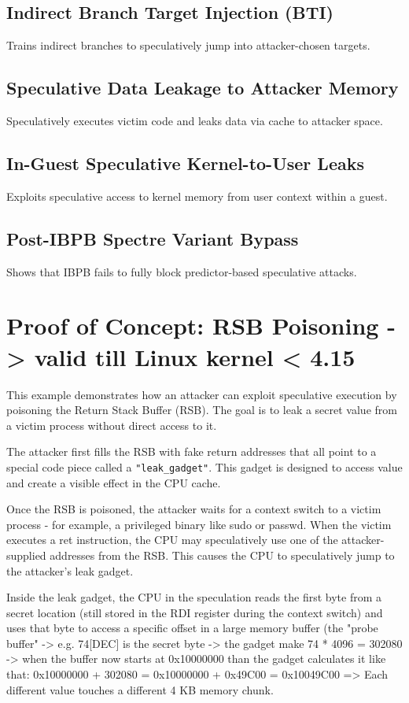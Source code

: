\documentclass[11pt,a4paper]{article}
\begin{document}
\subsection*{Indirect Branch Target Injection (BTI)}
Trains indirect branches to speculatively jump into attacker-chosen targets.

\subsection*{Speculative Data Leakage to Attacker Memory}
Speculatively executes victim code and leaks data via cache to attacker space.

\subsection*{In-Guest Speculative Kernel-to-User Leaks}
Exploits speculative access to kernel memory from user context within a guest.

\subsection*{Post-IBPB Spectre Variant Bypass}
Shows that IBPB fails to fully block predictor-based speculative attacks.

\section{Proof of Concept: RSB Poisoning -> valid till Linux kernel < 4.15}
This example demonstrates how an attacker can exploit speculative execution by poisoning the Return Stack Buffer (RSB). The goal is to leak a secret value from a victim process without direct access to it.

The attacker first fills the RSB with fake return addresses that all point to a special code piece called a \texttt{"leak\_gadget"}. This gadget is designed to access value and create a visible effect in the CPU cache.

Once the RSB is poisoned, the attacker waits for a context switch to a victim process - for example, a privileged binary like sudo or passwd. When the victim executes a ret instruction, the CPU may speculatively use one of the attacker-supplied addresses from the RSB. This causes the CPU to speculatively jump to the attacker’s leak gadget.

Inside the leak gadget, the CPU in the speculation reads the first byte from a secret location (still stored in the RDI register during the context switch) and uses that byte to access a specific offset in a large memory buffer (the "probe buffer" -> e.g. 74[DEC] is the secret byte -> the gadget make 74 * 4096 = 302080 -> when the buffer now starts at 0x10000000 than the gadget calculates it like that: 0x10000000 + 302080 = 0x10000000 + 0x49C00 = 0x10049C00 => Each different value touches a different 4 KB memory chunk.
\end{document}
